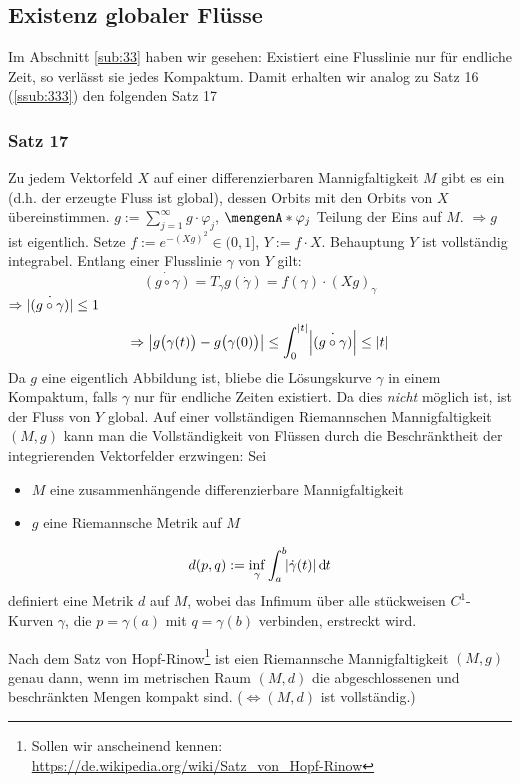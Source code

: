 \subsection{Existenz globaler Flüsse} %
\label{sub:34}
Im Abschnitt \ref{sub:33} haben wir gesehen: Existiert eine Flusslinie nur für endliche Zeit, so verlässt sie jedes Kompaktum. Damit erhalten wir analog zu Satz 16 (\ref{ssub:333}) den folgenden Satz 17

\subsubsection{Satz 17} %
\label{ssub:341}
Zu jedem Vektorfeld $X$ auf einer differenzierbaren Mannigfaltigkeit $M$ gibt es ein  (d.h. der erzeugte Fluss ist global), dessen
Orbits mit den Orbits von $X$ übereinstimmen.
$g := \sum_{j=1}^{\infty} g \cdot \varphi_j$, $\set{\varphi_j}$ Teilung der Eins auf $M$. $\Rightarrow g$ ist eigentlich. Setze $f := e^{- (X g)^2} \in (0,1]$, 
$Y := f \cdot X$. Behauptung $Y$ ist vollständig integrabel. Entlang einer Flusslinie $\gamma$ von $Y$ gilt: 
\[
	\dot{(g \circ \gamma)} = T_{\gamma} g (\dot{\gamma}) = f(\gamma) \cdot (X g)_\gamma
\]
$\Rightarrow \dot{\abs*{(g \circ \gamma)} } \le 1$ 
\[
	\Rightarrow \abs*{ g \enbrace[\big]{\gamma(t)} - g \enbrace[\big]{\gamma(0)}  } \le \int_{0} ^{\abs*{t} } \abs*{\dot{(g \circ \gamma)}} \le \abs*{t}    
\]
Da $g$ eine eigentlich Abbildung ist, bliebe die Lösungskurve $\gamma$ in einem Kompaktum, falls $\gamma$ nur für endliche Zeiten existiert. Da dies \emph{nicht} möglich 
ist, ist der Fluss von $Y$ global. \bewende 
Auf einer vollständigen Riemannschen Mannigfaltigkeit $(M,g)$ kann man die Vollständigkeit von Flüssen durch die Beschränktheit der integrierenden Vektorfelder erzwingen:
Sei
\begin{itemize}
	\item $M$ eine zusammenhängende differenzierbare Mannigfaltigkeit
	\item $g$ eine Riemannsche Metrik auf $M$
\end{itemize}
\[
	d(p,q) := \inf_{\gamma} \int_{a} ^{b} \! \abs*{\dot{\gamma}(t)}  \, \mathd t 
\]
definiert eine Metrik $d$ auf $M$, wobei das Infimum über alle stückweisen $C^1$-Kurven $\gamma$, die $p=\gamma(a)$ mit $q = \gamma(b)$ verbinden, erstreckt wird.

Nach dem Satz von Hopf-Rinow\footnote{Sollen wir anscheinend kennen: \url{https://de.wikipedia.org/wiki/Satz_von_Hopf-Rinow}} ist eien Riemannsche Mannigfaltigkeit $(M,g)$
 genau dann, wenn im metrischen Raum $(M,d)$ die abgeschlossenen und beschränkten Mengen kompakt sind. ($\Leftrightarrow (M,d)$ ist vollständig.)

